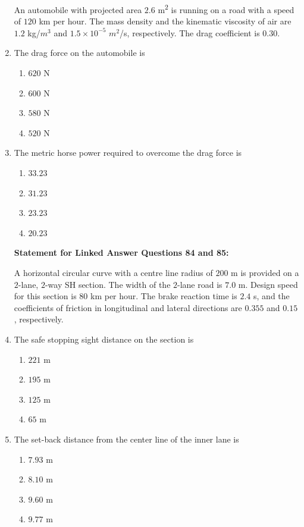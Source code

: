 \documentclass[journal]{IEEEtran}
\begin{document}
\begin{enumerate}
An automobile with projected area $2.6$ m\textsuperscript{2} is running on a road with a speed of $120$ km per hour. The mass density and the kinematic viscosity of air are $1.2$ kg/$m^{3}$ and $1.5 \times 10^{-5}$ $m^{2}$/s, respectively. The drag coefficient is $0.30$.

\item The drag force on the automobile is \hfill {}
\begin{enumerate}
\item $620$ N
\item $600$ N
\item $580$ N
\item $520$ N
\end{enumerate}

\item The metric horse power required to overcome the drag force is \hfill {}
\begin{enumerate}
\item $33.23$
\item $31.23$
\item $23.23$
\item $20.23$
\end{enumerate}


\textbf{Statement for Linked Answer Questions 84 and 85:}

A horizontal circular curve with a centre line radius of $200$ m is provided on a $2$-lane, $2$-way SH section. The width of the $2$-lane road is $7.0$ m. Design speed for this section is $80$ km per hour. The brake reaction time is $2.4$ s, and the coefficients of friction in longitudinal and lateral directions are $0.355$ and $0.15$, respectively.


\item The safe stopping sight distance on the section is \hfill {}
\begin{enumerate}
\item $221$ m
\item $195$ m
\item $125$ m
\item $65$ m
\end{enumerate}

\item The set-back distance from the center line of the inner lane is \hfill {}
\begin{enumerate}
\item $7.93$ m
\item $8.10$ m
\item $9.60$ m
\item $9.77$ m
\end{enumerate}


\end{enumerate}
\end{document}
